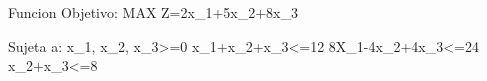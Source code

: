 Funcion Objetivo:
MAX Z=2x_1+5x_2+8x_3

Sujeta a:
x_1, x_2, x_3>=0 
x_1+x_2+x_3<=12
8X_1-4x_2+4x_3<=24
x_2+x_3<=8